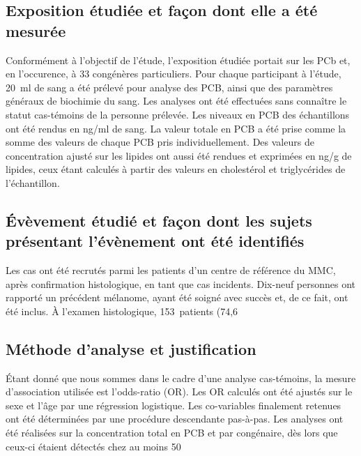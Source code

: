\documentclass[10pt]{article}
\begin{document}
\subsection{Exposition étudiée et façon dont elle a été mesurée}
Conformément à l'objectif de l'étude, l'exposition étudiée portait sur les PCb et, en l'occurence, à 33 congénères particuliers. Pour chaque participant à l'étude, 20~ml de sang a été prélevé pour analyse des PCB, ainsi que des paramètres généraux de biochimie du sang. Les analyses ont été effectuées sans connaître le statut cas-témoins de la personne prélevée. 
Les niveaux en PCB des échantillons ont été rendus en ng/ml de sang. La valeur totale en PCB a été prise comme la somme des valeurs de chaque PCB pris individuellement. Des valeurs de concentration ajusté sur les lipides ont aussi été rendues et exprimées en ng/g de lipides, ceux étant calculés à partir des valeurs en cholestérol et triglycérides de l'échantillon.  

\subsection{\'{E}vèvement étudié et façon dont les sujets présentant l'évènement ont été identifiés}
Les cas ont été recrutés parmi les patients d'un centre de référence du MMC, après confirmation histologique, en tant que cas incidents. Dix-neuf personnes ont rapporté un précédent mélanome, ayant été soigné avec succès et, de ce fait, ont été inclus. 
\`{A} l'examen histologique, 153~patients (74,6~%

\subsection{Méthode d'analyse et justification}
\'{E}tant donné que nous sommes dans le cadre d'une analyse cas-témoins, la mesure d'association utilisée est l'odds-ratio (OR). Les OR calculés ont été ajustés sur le sexe et l'âge par une régression logistique. Les co-variables finalement retenues ont été déterminées par une procédure descendante pas-à-pas. Les analyses ont été réalisées sur la concentration total en PCB et par congénaire, dès lors que ceux-ci étaient détectés chez au moins 50~%
\end{document}
